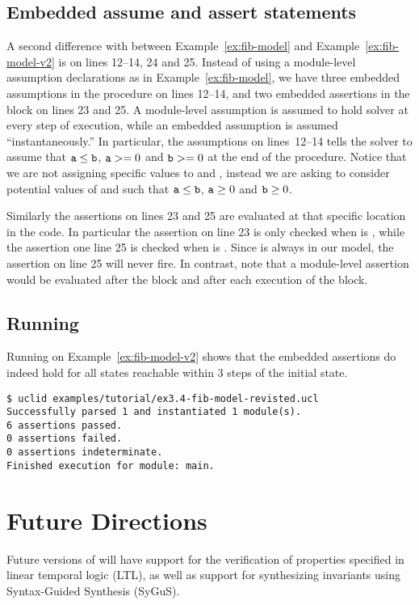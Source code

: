 \subsection{Embedded assume and assert statements}

A second difference with between Example~\ref{ex:fib-model} and Example~\ref{ex:fib-model-v2} is on lines 12--14, 24 and 25.  Instead of using a module-level assumption declarations as in Example~\ref{ex:fib-model}, we have three embedded assumptions in the  procedure on lines 12--14, and two embedded assertions in the  block on lines 23 and 25. A module-level assumption is assumed to hold solver at every step of execution, while an embedded assumption is assumed ``instantaneously.'' In particular, the assumptions on lines~12--14 tells the solver to assume that $\texttt{a} \leq \texttt{b}$, $\texttt{a} >= 0$ and $\texttt{b} >= 0$ at the end of the  procedure. Notice that we are not assigning specific values to  and , instead we are asking \uclid{} to consider potential values of  and  such that $\texttt{a} \leq \texttt{b}$, $\texttt{a} \geq 0$ and $\texttt{b} \geq 0$.

Similarly the assertions on lines 23 and 25 are evaluated at that specific location in the code. In particular the assertion on line 23 is only checked when  is , while the assertion one line 25 is checked when  is . Since  is always  in our model, the assertion on line 25 will never fire. In contrast, note that a module-level assertion would be evaluated after the  block and after each execution of the  block.

\subsection{Running \uclid{}}

Running \uclid{} on Example~\ref{ex:fib-model-v2} shows that the embedded assertions do indeed hold for all states reachable within 3 steps of the initial state.

\begin{Verbatim}[frame=single, samepage=true]
$ uclid examples/tutorial/ex3.4-fib-model-revisted.ucl 
Successfully parsed 1 and instantiated 1 module(s).
6 assertions passed.
0 assertions failed.
0 assertions indeterminate.
Finished execution for module: main.
\end{Verbatim}

\section{Future Directions}

Future versions of \uclid{} will have support for the verification of properties specified in linear temporal logic (LTL), as well as support for synthesizing invariants using Syntax-Guided Synthesis (SyGuS).
